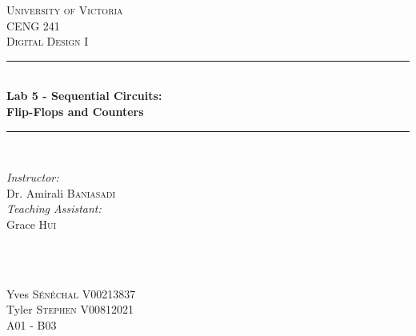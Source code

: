 \documentclass[11pt]{article}
\newcommand{\HRule}{\rule{\linewidth}{0.5mm}}
\begin{document}

\begin{titlepage}

\center
 
\textsc{\LARGE University of Victoria}\\[1cm] 	%
\textsc{\Large CENG 241}\\[0.5cm] 			%
\textsc{\large Digital Design I}\\[0.5cm] 		%


\HRule \\[0.4cm]
{\huge \bfseries Lab 5 - Sequential Circuits: \\Flip-Flops and Counters}\\[0.2cm] %
\HRule \\[1.5cm]
 
 
\begin{minipage}{0.7\textwidth}
\begin{flushleft} 

\large\emph{Instructor:} \\
Dr. Amirali \textsc{Baniasadi} \\
\vspace{12 pt}
\emph{Teaching Assistant:} \\
Grace \textsc{Hui}

\end{flushleft}
\end{minipage}
~
\begin{minipage}{0.1\textwidth}
\begin{flushright} \large
\vspace{12 pt}
\end{flushright}
\end{minipage}\\[2cm]


\Large Yves \textsc{S\'en\'echal}
\large V00213837	\\
\Large Tyler \textsc{Stephen}
\large V00812021	\\
A01 - B03\\[1.5cm] 



\end{titlepage}
\end{document}
